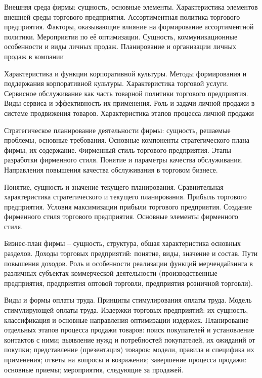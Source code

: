 \documentclass[
	11pt,
	a4paper,
	]
	{article}
\begin{document}
\bigskip

\noindent{} 
	{
		Внешняя среда фирмы: сущность, основные элементы. Характеристика элементов внешней среды торгового предприятия.
	}{
		Ассортиментная политика торгового предприятия. Факторы, оказывающие влияние на формирование ассортиментной политики. Мероприятия по её оптимизации.
	}{
		Сущность, коммуникационные особенности и виды личных продаж. Планирование и организации личных продаж в компании
	}

\bigskip

\noindent{} 
	{
		Характеристика и функции корпоративной культуры. Методы формирования и поддержания корпоративной культуры.
	}{
		Характеристика торговой услуги. Сервисное обслуживание как часть товарной политики торгового предприятия. Виды сервиса и эффективность их применения.
	}{
		Роль и задачи личной продажи в системе продвижения товаров. Характеристика этапов процесса личной продажи
	}

\bigskip

\noindent{} 
	{
		Стратегическое планирование деятельности фирмы: сущность, решаемые проблемы, основные требования. Основные компоненты стратегического плана фирмы, их содержание.
	}{
		Фирменный стиль торгового предприятия. Этапы разработки фирменного стиля.
	}{
		Понятие и параметры качества обслуживания. Направления повышения качества обслуживания в торговом бизнесе.
	}

\bigskip

\noindent{} 
	{
		Понятие, сущность и значение текущего планирования. Сравнительная характеристика стратегического и текущего планирования.
	}{
		Прибыль торгового предприятия. Условия максимизации прибыли торгового предприятия.
	}{
		Создание фирменного стиля торгового предприятия. Основные элементы фирменного стиля.
	}

\bigskip

\noindent{} 
	{
		Бизнес-план фирмы – сущность, структура, общая характеристика основных разделов.
	}{
		Доходы торговых предприятий: понятие, виды, значение и состав. Пути повышения доходов.
	}{
		Роль и особенности реализации функций мерчендайзинга в различных субъектах коммерческой деятельности (производственные предприятия, предприятия оптовой торговли, предприятия розничной торговли).
	}

\bigskip

\noindent{} 
	{
		Виды и формы оплаты труда. Принципы стимулирования оплаты труда. Модель стимулирующей оплаты труда.
	}{
		Издержки торговых предприятий: их сущность, классификация и основные направления оптимизации издержек.
	}{
		Планирование отдельных этапов процесса продажи товаров: поиск покупателей и установление контактов с ними; выявление нужд и потребностей покупателей, их ожиданий от покупки; представление (презентация) товаров: модели, правила и специфика их применения; ответы на вопросы и возражения; завершение процесса продажи: основные приемы; мероприятия, следующие за продажей.
	}
\end{document}
